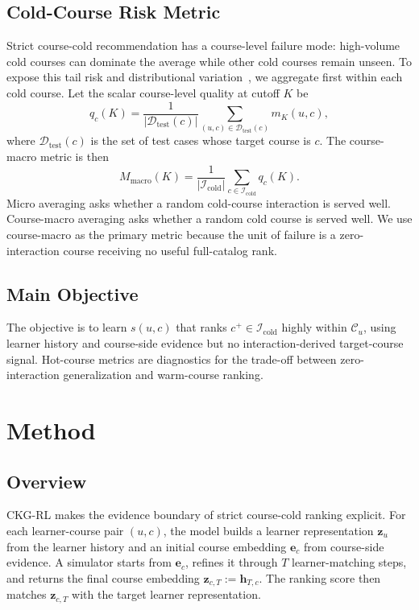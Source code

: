 \documentclass[letterpaper]{article}
\begin{document}
\subsection{Cold-Course Risk Metric}
Strict course-cold recommendation has a course-level failure mode: high-volume cold courses can dominate the average while other cold courses remain unseen. To expose this tail risk and distributional variation~\cite{ekstrand2024distributional,takehi2025diversification}, we aggregate first within each cold course. Let the scalar course-level quality at cutoff \(K\) be
\begin{equation}
q_c(K)=
\frac{1}{|\mathcal{D}_{\mathrm{test}}(c)|}
\sum_{(u,c)\in \mathcal{D}_{\mathrm{test}}(c)}
m_K(u,c),
\end{equation}
where \(\mathcal{D}_{\mathrm{test}}(c)\) is the set of test cases whose target course is \(c\). The course-macro metric is then
\begin{equation}
M_{\mathrm{macro}}(K)=
\frac{1}{|\mathcal{I}_{\mathrm{cold}}|}
\sum_{c\in\mathcal{I}_{\mathrm{cold}}} q_c(K).
\end{equation}
Micro averaging asks whether a random cold-course interaction is served well. Course-macro averaging asks whether a random cold course is served well. We use course-macro as the primary metric because the unit of failure is a zero-interaction course receiving no useful full-catalog rank.

\subsection{Main Objective}
The objective is to learn \(s(u,c)\) that ranks \(c^+\in\mathcal{I}_{\mathrm{cold}}\) highly within \(\mathcal{C}_u\), using learner history and course-side evidence but no interaction-derived target-course signal. Hot-course metrics are diagnostics for the trade-off between zero-interaction generalization and warm-course ranking.

\section{Method}
\subsection{Overview}
CKG-RL makes the evidence boundary of strict course-cold ranking explicit. For each learner-course pair \((u,c)\), the model builds a learner representation \(\mathbf{z}_u\) from the learner history and an initial course embedding \(\mathbf{e}_c\) from course-side evidence. A simulator starts from \(\mathbf{e}_c\), refines it through \(T\) learner-matching steps, and returns the final course embedding \(\mathbf{z}_{c,T}:=\mathbf{h}_{T,c}\). The ranking score then matches \(\mathbf{z}_{c,T}\) with the target learner representation.
\end{document}
